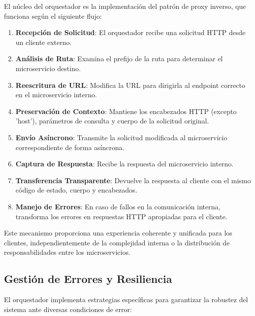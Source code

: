 \documentclass[12pt,a4paper]{article}
\begin{document}
El núcleo del orquestador es la implementación del patrón de proxy inverso, que funciona según el siguiente flujo:

\begin{enumerate}
    \item \textbf{Recepción de Solicitud}: El orquestador recibe una solicitud HTTP desde un cliente externo.
    
    \item \textbf{Análisis de Ruta}: Examina el prefijo de la ruta para determinar el microservicio destino.
    
    \item \textbf{Reescritura de URL}: Modifica la URL para dirigirla al endpoint correcto en el microservicio interno.
    
    \item \textbf{Preservación de Contexto}: Mantiene los encabezados HTTP (excepto 'host'), parámetros de consulta y cuerpo de la solicitud original.
    
    \item \textbf{Envío Asíncrono}: Transmite la solicitud modificada al microservicio correspondiente de forma asíncrona.
    
    \item \textbf{Captura de Respuesta}: Recibe la respuesta del microservicio interno.
    
    \item \textbf{Transferencia Transparente}: Devuelve la respuesta al cliente con el mismo código de estado, cuerpo y encabezados.
    
    \item \textbf{Manejo de Errores}: En caso de fallos en la comunicación interna, transforma los errores en respuestas HTTP apropiadas para el cliente.
\end{enumerate}

Este mecanismo proporciona una experiencia coherente y unificada para los clientes, independientemente de la complejidad interna o la distribución de responsabilidades entre los microservicios.

\subsection{Gestión de Errores y Resiliencia}
\label{subsec:os-resiliencia}

El orquestador implementa estrategias específicas para garantizar la robustez del sistema ante diversas condiciones de error:
\end{document}
